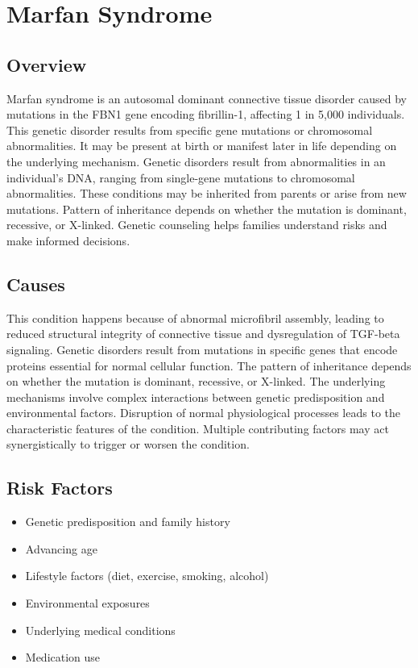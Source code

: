 \chapter{Marfan Syndrome}
\label{sec:Marfan Syndrome}

\section{Overview}
Marfan syndrome is an autosomal dominant connective tissue disorder caused by mutations in the FBN1 gene encoding fibrillin-1, affecting 1 in 5,000 individuals. This genetic disorder results from specific gene mutations or chromosomal abnormalities. It may be present at birth or manifest later in life depending on the underlying mechanism. Genetic disorders result from abnormalities in an individual's DNA, ranging from single-gene mutations to chromosomal abnormalities. These conditions may be inherited from parents or arise from new mutations. Pattern of inheritance depends on whether the mutation is dominant, recessive, or X-linked. Genetic counseling helps families understand risks and make informed decisions.
\section{Causes}
This condition happens because of abnormal microfibril assembly, leading to reduced structural integrity of connective tissue and dysregulation of TGF-beta signaling. Genetic disorders result from mutations in specific genes that encode proteins essential for normal cellular function. The pattern of inheritance depends on whether the mutation is dominant, recessive, or X-linked. The underlying mechanisms involve complex interactions between genetic predisposition and environmental factors. Disruption of normal physiological processes leads to the characteristic features of the condition. Multiple contributing factors may act synergistically to trigger or worsen the condition.
\section{Risk Factors}


\begin{itemize}[noitemsep]
  \item Genetic predisposition and family history
  \item Advancing age
  \item Lifestyle factors (diet, exercise, smoking, alcohol)
  \item Environmental exposures
  \item Underlying medical conditions
  \item Medication use
\end{itemize}
